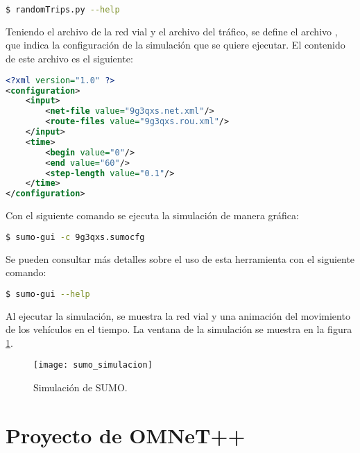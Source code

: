 \begin{lstlisting}[language=bash]
$ randomTrips.py --help
\end{lstlisting}

Teniendo el archivo  de la red vial y el archivo
 del tráfico, se define el archivo ,
que indica la configuración de la simulación que se quiere ejecutar. El
contenido de este archivo es el siguiente:

\begin{lstlisting}[language=XML]
<?xml version="1.0" ?>
<configuration>
    <input>
        <net-file value="9g3qxs.net.xml"/>
        <route-files value="9g3qxs.rou.xml"/>
    </input>
    <time>
        <begin value="0"/>
        <end value="60"/>
        <step-length value="0.1"/>
    </time>
</configuration>
\end{lstlisting}

Con el siguiente comando se ejecuta la simulación de manera gráfica:

\begin{lstlisting}[language=bash]
$ sumo-gui -c 9g3qxs.sumocfg
\end{lstlisting}

Se pueden consultar más detalles sobre el uso de esta herramienta con el
siguiente comando:

\begin{lstlisting}[language=bash]
$ sumo-gui --help
\end{lstlisting}

Al ejecutar la simulación, se muestra la red vial y una animación del
movimiento de los vehículos en el tiempo. La ventana de la simulación se muestra
en la figura \ref{fig:sumo_simulacion}.

\begin{figure}[th!]
\centering
\texttt{[image: sumo\_simulacion]}
\decoRule
\caption[Simulación de SUMO]{Simulación de SUMO.}
\label{fig:sumo_simulacion}
\end{figure}


\section{Proyecto de OMNeT++}


